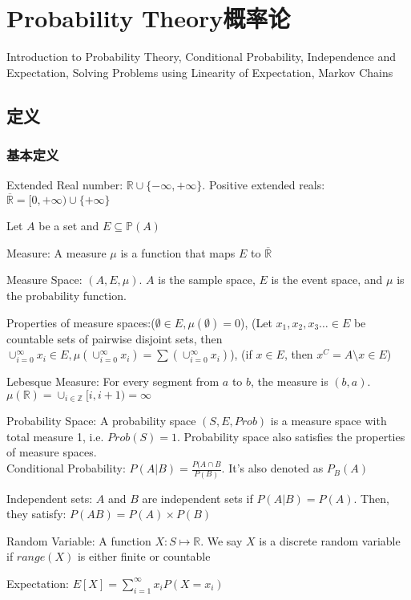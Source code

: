 \documentclass[12pt,a4paper]{ctexrep}
\begin{document}
\fi

\chapter{Probability Theory概率论}
Introduction to Probability Theory, Conditional Probability, Independence and Expectation, Solving Problems using Linearity of Expectation, Markov Chains
\section{定义}
\subsection{基本定义}
Extended Real number: $\mathbb{R}\cup \{-\infty,+\infty\}$. Positive extended reals:$\overline{\mathbb{R}} = [0,+\infty) \cup \{+\infty\}$

Let $A$ be a set and $E \subseteq \mathbb{P}(A)$

Measure: A measure $\mu$ is a function that maps $E$ to $\overline{\mathbb{R}}$

Measure Space: $(A,E,\mu)$. $A$ is the sample space, $E$ is the event space, and $\mu$ is the probability function.

Properties of measure spaces:($\emptyset \in E, \mu(\emptyset) = 0$), (Let $x_1,x_2,x_3\dots \in E$ be countable sets of pairwise disjoint sets, then $\cup_{i=0}^{\infty} x_i\in E, \mu(\cup_{i=0}^{\infty} x_i) = \sum(\cup_{i=0}^{\infty} x_i)$), (if $x \in E$, then $x^C = A \setminus x \in E$)

Lebesque Measure: For every segment from $a$ to $b$, the measure is $(b,a)$. $\mu(\mathbb{R}) = \cup_{i\in \mathbb{Z}} [i,i+1) = \infty$

Probability Space: A probability space $(S,E,Prob)$ is a measure space with total measure 1, i.e. $Prob(S) = 1$. Probability space also satisfies the properties of measure spaces.\\

Conditional Probability: $P(A|B) = \frac{P(A\cap B}{P(B)}$. It's also denoted as $P_B(A)$

Independent sets: $A$ and $B$ are independent sets if $P(A|B) = P(A)$. Then, they satisfy: $P(AB) = P(A)\times P(B)$

Random Variable: A function $X: S \mapsto \mathbb{R}$. We say $X$ is a discrete random variable if $range(X)$ is either finite or countable

Expectation: $E[X] = \sum_{i = 1}^{\infty} x_i P(X = x_i)$
\end{document}

